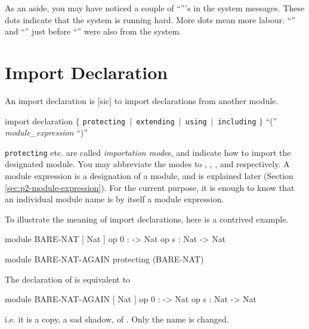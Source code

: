 \documentclass[a4paper]{memoir}
\begin{document}
As an aside, you may have noticed a couple of
``'''s in the system messages. These dots indicate that the
system is running hard. More dots mean more labour.
``\kbd{\_}'' and ``\kbd{*}'' just before ``''
were also from the system.

\section{Import Declaration} \label{sec:p2-import-decl}

An import declaration is [sic] to import
declarations from another module.

\begin{bsyntax} import declaration \Hline
$\{$ \texttt{protecting $|$ extending $|$ using $|$ including} $\}$ ``('' \textit{module\_expression} ``)''
\end{bsyntax}

\verb|protecting| etc. are called {\em importation mode\/}s,
 and indicate how to import the designated module.
You may abbreviate the modes to , , , and 
respectively.
A module expression is a designation of a module, and is explained later
(Section \ref{sec:p2-module-expression}).
For the current purpose, it is enough to know that an individual module name
is by itself a module expression.

To illustrate the meaning of import declarations, here is a contrived example.
\begin{vvtm}
\begin{ccode}
   module BARE-NAT {
     [ Nat ]
     op 0 : -> Nat
     op s : Nat -> Nat
   }

   module BARE-NAT-AGAIN {
     protecting (BARE-NAT)
   }
\end{ccode}
\end{vvtm}
The declaration of  is equivalent to
\begin{vvtm}
\begin{ccode}
   module BARE-NAT-AGAIN {
     [ Nat ]
      op 0 : -> Nat
      op s : Nat -> Nat 
   }
\end{ccode}
\end{vvtm}
i.e. it is a copy, a sad shadow, of . Only the name is
changed.
\end{document}
